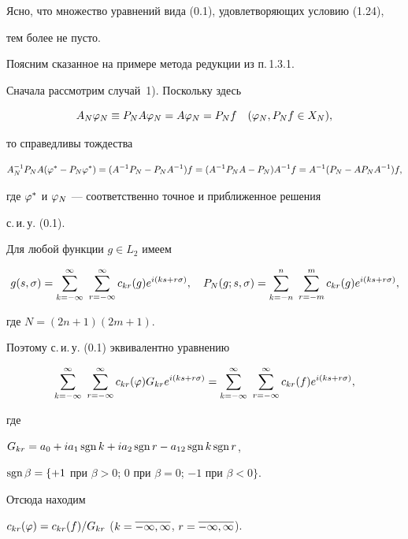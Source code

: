 Ясно, что  множество уравнений вида (0.1), удовлетворяющих условию (1.24), 


тем более не пусто. 





Поясним сказанное на примере метода редукции из п.\,1.3.1. 


Сначала рассмотрим случай~1). Поскольку здесь 


$$


A_N \vp_N \equiv P_NA\vp_N = A\vp_N = P_N f \quad (\vp_N, P_Nf\in X_N),


$$


то справедливы тождества


$$


A_N^{-1}P_NA(\vp^* - P_N\vp^*) = (A^{-1}P_N - P_NA^{-1})f =


(A^{-1}P_NA - P_N)A^{-1}f = A^{-1}(P_N - AP_NA^{-1})f,


$$


где $\varphi^*$ и $\varphi_N$ --- соответственно точное и приближенное решения 


с.\,и.\,у. (0.1). 





Для любой функции $g\in L_2$  имеем


$$


g(s,\si) = \sum_{k=-\infty}^\infty\ \sum_{r=-\infty}^\infty


c_{kr}(g)e^{i(ks+r\si)},\quad 


P_N(g;s,\si)=\sum_{k=-n}^n\ \sum_{r=-m}^m c_{kr}(g)e^{i(ks+r\si)},


$$


где $N = (2n+1)(2m+1)$.


Поэтому с.\,и.\,у. (0.1) эквивалентно уравнению 


$$


\sum_{k=-\infty}^\infty\ \sum_{r=-\infty}^\infty c_{kr}(\vp)


G_{kr}e^{i(ks+r\si)}=


\sum_{k=-\infty}^\infty\ \sum_{r=-\infty}^\infty c_{kr}(f)e^{i(ks+r\si)},


$$


где 


$G_{kr} = a_0+ia_1\operatorname{sgn} k + i a_2 \operatorname{sgn} r - a_{12}\operatorname{sgn} k \operatorname{sgn} r$,


$\operatorname{sgn}\beta = \{+1$ при $\beta>0$; $0$ при $\beta=0$; $-1$ при $\beta<0\}$.


Отсюда находим


$c_{kr}(\varphi)=c_{kr}(f)/G_{kr}$ ($k=\overline{-\infty,\infty}$, $r=\overline{-\infty,\infty}$).


